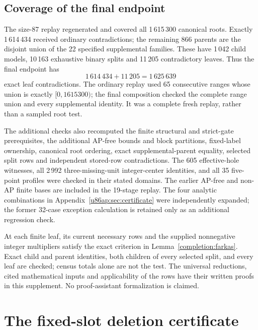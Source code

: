 \documentclass[11pt,a4paper]{article}
\theoremstyle{remark}
\begin{document}
\subsection{Coverage of the final endpoint}
The size-87 replay regenerated and covered all 1\,615\,300 canonical
roots. Exactly 1\,614\,434 received ordinary contradictions; the
remaining 866 parents are the disjoint union of the 22 specified
supplemental families. These have 1\,042 child models,
10\,163 exhaustive binary splits and 11\,205 contradictory leaves.
Thus the final endpoint has
\[
 1\,614\,434+11\,205=1\,625\,639
\]
exact leaf contradictions. The ordinary replay used 65 consecutive
ranges whose union is exactly $[0,1615300)$; the final composition
checked the complete range union and every supplemental identity.
It was a complete fresh replay, rather than a sampled root test.

The additional checks also recomputed the finite structural and
strict-gate prerequisites, the additional AP-free bounds and block
partitions, fixed-label ownership, canonical root ordering, exact
supplemental-parent equality, selected split rows and independent
stored-row contradictions. The 605 effective-hole witnesses, all
2\,992 three-missing-unit integer-center identities, and all 35
five-point profiles were checked in their stated domains. The earlier
AP-free and non-AP finite bases are included in the 19-stage replay.
The four analytic combinations in Appendix~\ref{u86ap:sec:certificate}
were independently expanded; the former 32-case exception calculation
is retained only as an additional regression check.

At each finite leaf, its current necessary rows and the supplied
nonnegative integer multipliers satisfy the exact criterion in
Lemma~\ref{completion:farkas}. Exact child and parent identities, both
children of every selected split, and every leaf are checked; census
totals alone are not the test. The universal reductions, cited
mathematical inputs and applicability of the rows have their written
proofs in this supplement. No proof-assistant formalization is claimed.


\clearpage\appendix

\section{The fixed-slot deletion certificate}\label{base:app:slots}
\end{document}
